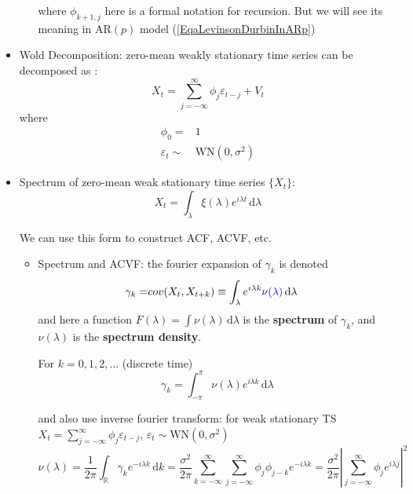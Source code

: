 \begin{itemize}[topsep=2pt,itemsep=0pt]
\begin{itemize}[topsep=2pt,itemsep=0pt]
        where $ \phi _{k+1,j} $ here is a formal notation for recursion. But we will see its meaning in AR$ (p) $ model (\autoref{EqaLevinsonDurbinInARp})
        
        
    \end{itemize}
        
            
    

        \item Wold Decomposition: zero-mean weakly stationary time series can be decomposed as :
        \begin{equation}
            X_t=\sum_{j=-\infty}^\infty \phi _j\varepsilon _{t-j}+V_t 
        \end{equation}
        where
        \begin{align}
            \phi _0=&1\\
            \varepsilon _t\sim &\mathrm{WN}(0,\sigma ^2) 
        \end{align}


        \item Spectrum of zero-mean weak stationary time series $ \{X_t\} $:
        \begin{equation}
            X_t=\int _\lambda \xi (\lambda )e^{i\lambda t} \,\mathrm{d}\lambda 
        \end{equation}

        We can use this form to construct ACF, ACVF, etc.
        \begin{itemize}[topsep=2pt,itemsep=0pt]
            \item Spectrum and ACVF: the fourier expansion of $ \gamma _k $ is denoted
            \begin{align}
                \gamma _k=&cov(X_t,X_{t+k})\equiv\int _{\lambda } e^{i\lambda k}{\color{blue}\nu (\lambda )}  \,\mathrm{d}\lambda 
            \end{align}
            and here a function $ F(\lambda )=\int \nu (\lambda ) \,\mathrm{d}\lambda  $ is the \textbf{spectrum} of $ \gamma _k $, and $ \nu(\lambda )$ is the\textbf{ spectrum density}.

            For $ k=0,1,2,\ldots $ (discrete time)
            \begin{equation}
                \gamma _k=\int _{-\pi}^\pi \nu (\lambda )e^{i\lambda k} \,\mathrm{d}\lambda  
            \end{equation}
            
            and also use inverse fourier transform: for weak stationary TS $ X_t=\sum_{j=-\infty}^\infty \phi _j\varepsilon _{t-j} $, $ \varepsilon _t\sim \mathrm{WN}(0,\sigma ^2)  $
            \begin{equation}
                \nu (\lambda )=\dfrac{1}{2\pi}\int _\mathbb{R}\gamma _k e^{-i\lambda k} \,\mathrm{d}k  =\dfrac{\sigma ^2}{2\pi}\sum_{k=-\infty}^{\infty}\sum_{j=-\infty}^{\infty}\phi _j\phi _{j-k}e^{-i\lambda k}= \dfrac{\sigma ^2}{2\pi}\left\vert \sum_{j=-\infty}^\infty \phi _je^{i\lambda j} \right\vert ^2
            \end{equation}
            

\end{itemize}
\end{itemize}
